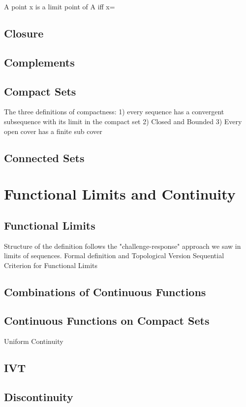 \documentclass{tufte-book}
\theoremstyle{definition}
\numberwithin{section}{chapter}
\begin{document}
	  A point x is a limit point of A iff x=

\newthought{}

\subsection{Closure}
\subsection{Complements}
\subsection{Compact Sets}
The three definitions of compactness: 1) every sequence has a convergent subsequence with its limit in the compact set 2) Closed and Bounded 3) Every open cover has a finite sub cover

\subsection{Connected Sets}


\section{Functional Limits and Continuity}
\subsection{Functional Limits}
Structure of the definition follows the "challenge-response" approach we saw in limits of sequences.
Formal definition and Topological Version
Sequential Criterion for Functional Limits
\subsection{Combinations of Continuous Functions}
\subsection{Continuous Functions on Compact Sets}
Uniform Continuity
\subsection{IVT}
\subsection{Discontinuity}
\end{document}
